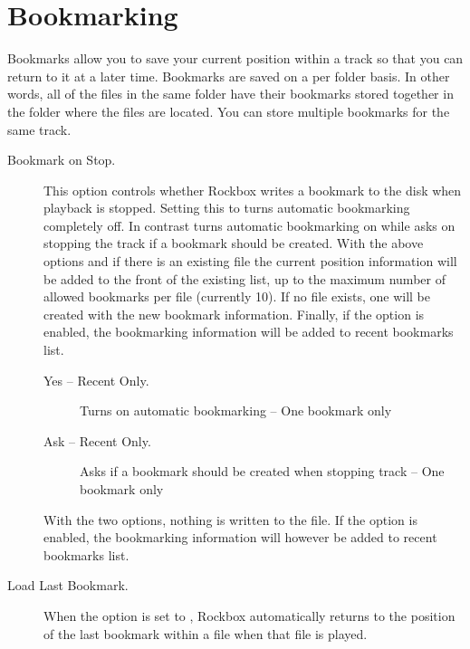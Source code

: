 \section{\label{ref:Bookmarkconfigactual}Bookmarking}
  Bookmarks allow you to save your current position within a track so that 
  you can return to it at a later time. Bookmarks are saved on a per folder
  basis. In other words, all of the files in the same folder have their
  bookmarks stored together in the folder where the files are located. You
  can store multiple bookmarks for the same track.
  \begin{description}
  \item [Bookmark on Stop. ]This option controls whether Rockbox writes a
    bookmark to the disk when playback is stopped. Setting this to
     turns automatic bookmarking completely off. In contrast
     turns automatic bookmarking on while  
    asks on stopping the track if a bookmark should be created.
    With the above options  and  if there is an existing 
     file the current position information will be added to the
    front of the existing list, up to the maximum number of allowed bookmarks
    per file (currently 10). If no  file exists, one will be
    created with the new bookmark information. Finally, if the 
     option is enabled, the bookmarking
    information will be added to recent bookmarks list.
    \begin{description}    
      \item[Yes -- Recent Only.]
            Turns on automatic bookmarking -- One bookmark only
      \item[Ask -- Recent Only.]
            Asks if a bookmark should be created when stopping track -- 
            One bookmark only
    \end{description}
    With the two  options, nothing is written to the 
     file. If the 
    option is enabled, the bookmarking information will however be added to
    recent bookmarks list. 
    
  \item [Load Last Bookmark. ]

  When the  option is set to , Rockbox
  automatically returns to the position of the last bookmark within a file
  when that file is played. 


\end{description}

